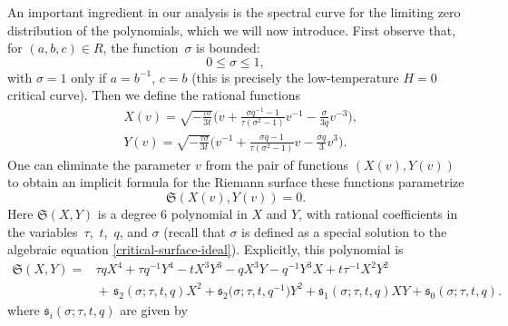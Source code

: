 \documentclass[pdftex]{sigma}
\numberwithin{equation}{section}
\begin{document}
 An important ingredient in our analysis is the spectral curve for the limiting zero distribution of the polynomials, which we will now introduce. First
 observe that, for $(a,b,c)\in R$, the function~$\sigma$ is bounded:
 \begin{equation*}
 0 \leq \sigma \leq 1,
 \end{equation*}
 with $\sigma = 1$ only if $a=b^{-1}$, $c=b$ (this is precisely the low-temperature $H=0$ critical curve).
 Then we define the rational functions
 \begin{align} \label{Xv}
 &X(v) = \sqrt{-\frac{\tau \sigma}{3t}}\biggl(v + \frac{\sigma q^{-1} -1}{\tau(\sigma^2-1)} v^{-1} - \frac{\sigma}{3q}v^{-3}\biggr),\\
 &Y(v) = \sqrt{-\frac{\tau \sigma}{3t}}\biggl(v^{-1} + \frac{\sigma q -1}{\tau(\sigma^2-1)} v - \frac{\sigma q}{3}v^{3}\biggr).\label{Yv}
 \end{align}
One can eliminate the parameter $v$ from the pair of functions $(X(v),Y(v))$ to obtain an implicit formula for the Riemann surface these functions parametrize
 \begin{equation*}
 \mathfrak{S}(X(v),Y(v)) = 0.
 \end{equation*}
Here $\mathfrak{S}(X,Y)$ is a degree $6$ polynomial in $X$ and $Y$, with rational coefficients in the variables~$\tau$,~$t$,~$q$, and $\sigma$ (recall that $\sigma$ is defined as a special solution to the algebraic equation \eqref{critical-surface-ideal}). Explicitly, this polynomial is
 \begin{align*}
 \mathfrak{S}(X,Y)={}& \tau q X^4 + \tau q^{-1}Y^4 -tX^3Y^3 - qX^3Y - q^{-1}Y^3X + t\tau^{-1}X^2Y^2\\
 &{}{+}\, \mathfrak{s}_2(\sigma;\tau,t,q) X^2 + \mathfrak{s}_2\bigl(\sigma;\tau,t,q^{-1}\bigr) Y^2 + \mathfrak{s}_1(\sigma;\tau,t,q) XY + \mathfrak{s}_0(\sigma;\tau,t,q).\nonumber
 \end{align*}
where $\mathfrak{s}_i(\sigma;\tau,t,q)$ are given by
\end{document}
